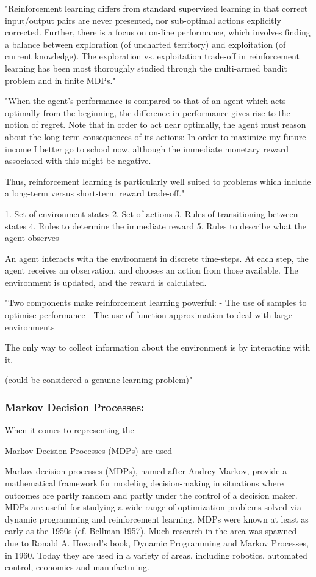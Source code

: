 \documentclass[a4paper,oneside]{report}
\begin{document}
"Reinforcement learning differs from standard supervised learning in that correct input/output pairs are never presented, nor sub-optimal actions explicitly corrected. Further, there is a focus on on-line performance, which involves finding a balance between exploration (of uncharted territory) and exploitation (of current knowledge). The exploration vs. exploitation trade-off in reinforcement learning has been most thoroughly studied through the multi-armed bandit problem and in finite MDPs."

"When the agent's performance is compared to that of an agent which acts optimally from the beginning, the difference in performance gives rise to the notion of regret. Note that in order to act near optimally, the agent must reason about the long term consequences of its actions: In order to maximize my future income I better go to school now, although the immediate monetary reward associated with this might be negative.

Thus, reinforcement learning is particularly well suited to problems which include a long-term versus short-term reward trade-off."

1. Set of environment states
2. Set of actions
3. Rules of transitioning between states
4. Rules to determine the immediate reward
5. Rules to describe what the agent observes

An agent interacts with the environment in discrete time-steps. At each step, the agent receives an observation, and chooses an action from those available. The environment is updated, and the reward is calculated.

"Two components make reinforcement learning powerful: 
-	The use of samples to optimise performance 
-	The use of function approximation to deal with large environments

The only way to collect information about the environment is by interacting with it.

(could be considered a genuine learning problem)"

\subsubsection{Markov Decision Processes:}

When it comes to representing the 

Markov Decision Processes (MDPs) are used 



Markov decision processes (MDPs), named after Andrey Markov, provide a mathematical framework for modeling decision-making in situations where outcomes are partly random and partly under the control of a decision maker. MDPs are useful for studying a wide range of optimization problems solved via dynamic programming and reinforcement learning. MDPs were known at least as early as the 1950s (cf. Bellman 1957). Much research in the area was spawned due to Ronald A. Howard's book, Dynamic Programming and Markov Processes, in 1960. Today they are used in a variety of areas, including robotics, automated control, economics and manufacturing.
\end{document}
